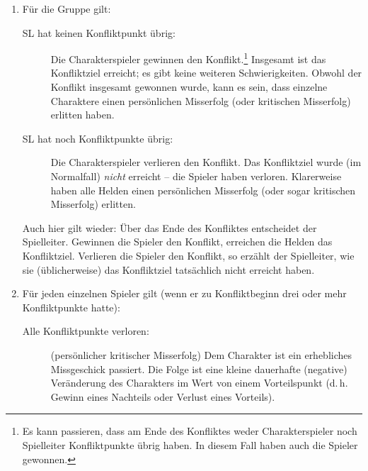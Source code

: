 \begin{enumerate}
\item Für die Gruppe gilt:
\begin{description}
\item[SL hat keinen Konfliktpunkt übrig:] Die Charakterspieler gewinnen den Konflikt.\footnote{Es kann passieren, dass am Ende des Konfliktes weder Charakterspieler noch Spielleiter Konfliktpunkte übrig haben. In diesem Fall haben auch die Spieler gewonnen.} Insgesamt ist das Konfliktziel erreicht; es gibt keine weiteren Schwierigkeiten. Obwohl der Konflikt insgesamt gewonnen wurde, kann es sein, dass einzelne Charaktere einen persönlichen Misserfolg (oder kritischen Misserfolg) erlitten haben.
  \item[SL hat noch Konfliktpunkte übrig:] Die Charakterspieler verlieren den Konflikt. Das Konfliktziel wurde (im Normalfall) \emph{nicht} erreicht -- die Spieler haben verloren. Klarerweise haben alle Helden einen persönlichen Misserfolg (oder sogar kritischen Misserfolg) erlitten.
\end{description}


 Auch hier gilt wieder: Über das Ende des Konfliktes entscheidet der Spielleiter.  Gewinnen die Spieler den Konflikt, erreichen die Helden das Konfliktziel. Verlieren die Spieler den Konflikt, so erzählt der Spielleiter, wie sie (üblicherweise) das Konfliktziel tatsächlich nicht erreicht haben.

\item Für jeden einzelnen Spieler gilt (wenn er zu Konfliktbeginn drei oder mehr Konfliktpunkte hatte):
\begin{description}
  \item[Alle Konfliktpunkte verloren:] (persönlicher kritischer Misserfolg) Dem Charakter ist ein erhebliches Missgeschick passiert. Die Folge ist eine kleine dauerhafte (negative) Veränderung des Charakters im Wert von einem Vorteilspunkt (d.\,h. Gewinn eines Nachteils oder Verlust eines Vorteils).
  

\end{description}
\end{enumerate}
